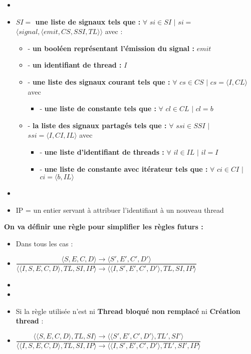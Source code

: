 \documentclass[10pt,a4paper]{article}
\begin{document}
\begin{itemize}
			\item[]
			\item[] \textbf{$SI =$ une liste de signaux tels que :} $\forall$ $si \in SI$ $|$ $si =$ $\langle signal,\langle emit,CS,SSI,TL\rangle\rangle$ avec :
			\begin{itemize}
				\item[] - \textbf{un booléen représentant l'émission du signal :} $emit$
				\item[] - \textbf{un identifiant de thread :} $I$
				\item[] - \textbf{une liste des signaux courant tels que :} $\forall$ $cs \in CS$ $|$ $cs = \langle I,CL\rangle$ avec 
				\begin{itemize}
					\item[] - \textbf{une liste de constante tels que :} $\forall$ $cl \in CL$ $|$ $cl = b$
				\end{itemize}
			
				\item[] - \textbf{la liste des signaux partagés tels que :} $\forall$ $ssi \in SSI$ $|$ $ssi = \langle I,CI,IL\rangle$ avec 
				\begin{itemize}
					\item[] - \textbf{une liste d'identifiant de threads :} $\forall$ $il \in IL$ $|$ $il = I$
					\item[] - \textbf{une liste de constante avec itérateur tels que :} $\forall$ $ci \in CI$ $|$ $ci = \langle b, IL\rangle$
				\end{itemize}
			\end{itemize}
			\item[]
			\item[] IP = un entier servant à attribuer l'identifiant à un nouveau thread 
		\end{itemize}
		\bigbreak
		
		\textbf{On va définir une règle pour simplifier les règles futurs :} 
		\begin{itemize}
			\item[] Dans tous les cas :
			\item[] \begin{center}
						$\dfrac{\langle S,E,C,D\rangle \rightarrow \langle S',E',C',D'\rangle}{\langle\langle I,S,E,C,D\rangle,TL,SI,IP\rangle \rightarrow \langle\langle I,S',E',C',D'\rangle,TL,SI,IP\rangle}$
					\end{center}
			\item[]
			\item[]
			\item[] Si la règle utilisée n'est ni \textbf{Thread bloqué non remplacé} ni \textbf{Création thread} :
			\smallbreak 
			\item[] \begin{center}
						$\dfrac{\langle\langle S,E,C,D\rangle,TL,SI\rangle \rightarrow \langle\langle S',E',C',D'\rangle,TL',SI'\rangle}{\langle\langle I,S,E,C,D\rangle,TL,SI,IP\rangle \rightarrow \langle\langle I,S',E',C',D'\rangle,TL',SI',IP\rangle}$ 
					\end{center}
		\end{itemize}
		\newpage
		
\end{document}
